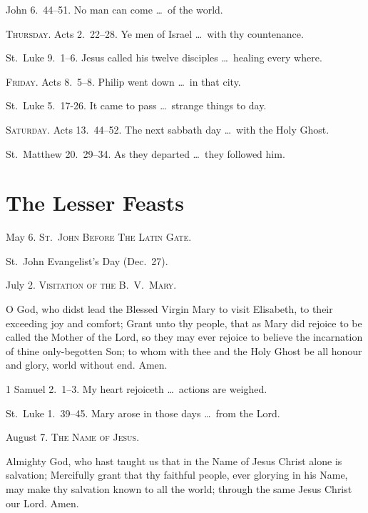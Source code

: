  John 6.~44–51.   No man can come \ldots\ of the world.

{\scshape Thursday.}  Acts 2.~22–28.   Ye men of Israel \ldots\ with thy countenance.

 St.~Luke 9.~1–6.   Jesus called his twelve disciples \ldots\ healing every where.

{\scshape Friday.}  Acts 8.~5–8.   Philip went down \ldots\ in that city.

 St.~Luke 5.~17-26.   It came to pass \ldots\ strange things to day.

{\scshape Saturday.}  Acts 13.~44–52.   The next sabbath day \ldots\ with the Holy Ghost.

 St.~Matthew 20.~29–34.   As they departed \ldots\ they followed him.


\section{The Lesser Feasts}

\noindent May 6. {\scshape St.~John Before The Latin Gate.} 

 St.~John Evangelist’s Day (Dec.~27).

\medskip

\noindent July 2. {\scshape Visitation of the B.~V.~Mary.}

 O God, who didst lead the Blessed Virgin Mary to visit Elisabeth, to their exceeding joy and comfort; Grant unto thy people, that as Mary did rejoice to be called the Mother of the Lord, so they may ever rejoice to believe the incarnation of thine only-begotten Son; to whom with thee and the Holy Ghost be all honour and glory, world without end. \R Amen.
    
 1 Samuel 2.~1–3.   My heart rejoiceth \ldots\ actions are weighed.

 St.~Luke 1.~39–45.   Mary arose in those days \ldots\ from the Lord.

\medskip

\noindent August 7. {\scshape The Name of Jesus.}

 Almighty God, who hast taught us that in the Name of Jesus Christ alone is salvation; Mercifully grant that thy faithful people, ever glorying in his Name, may make thy salvation known to all the world; through the same Jesus Christ our Lord. \R Amen.

